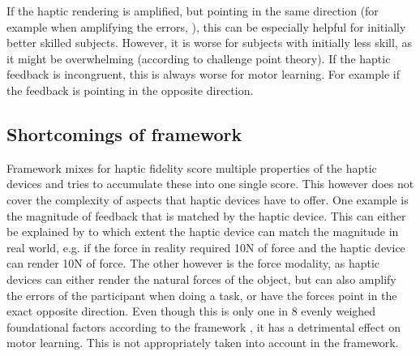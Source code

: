 If the haptic rendering is amplified, but pointing in the same direction (for example when amplifying the errors, \cite{Oquendo2024}), this can be especially helpful for initially better skilled subjects. However, it is worse for subjects with initially less skill, as it might be overwhelming (according to challenge point theory). If the haptic feedback is incongruent, this is always worse for motor learning. For example if the feedback is pointing in the opposite direction.

\subsection{Shortcomings of framework}
Framework mixes for haptic fidelity score multiple properties of the haptic devices and tries to accumulate these into one single score. This however does not cover the complexity of aspects that haptic devices have to offer. One example is the magnitude of feedback that is matched by the haptic device. This can either be explained by to which extent the haptic device can match the magnitude in real world, e.g. if the force in reality required 10N of force and the haptic device can render 10N of force. The other however is the force modality, as haptic devices can either render the natural forces of the object, but can also amplify the errors of the participant when doing a task, or have the forces point in the exact opposite direction. Even though this is only one in 8 evenly weighed foundational factors according to the framework \cite{Muender2022HapticReality}, it has a detrimental effect on motor learning. This is not appropriately taken into account in the framework.

